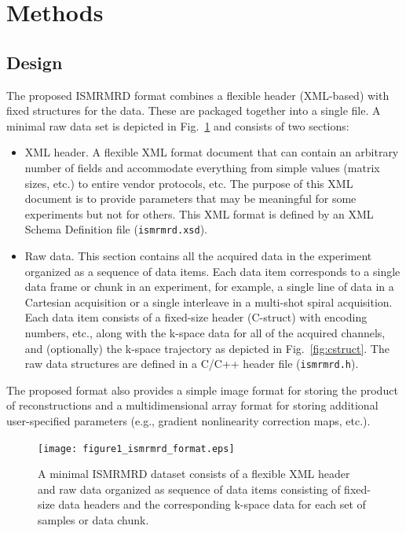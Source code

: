 \documentclass[12pt, draft]{article}
\begin{document}
\section*{Methods}
\subsection*{Design}
The proposed ISMRMRD format combines a flexible header (XML-based) with fixed structures for the data. These are packaged together into a single file.  A minimal raw data set is depicted in Fig.~\ref{fig:format} and consists of two sections:
\begin{itemize}
\item{XML header.} A flexible XML format document that can contain an arbitrary number of fields and accommodate everything from simple values (matrix sizes, etc.) to entire vendor protocols, etc. The purpose of this XML document is to provide parameters that may be meaningful for some experiments but not for others. This XML format is defined by an XML Schema Definition file (\texttt{ismrmrd.xsd}).
\item{Raw data.} This section contains all the acquired data in the experiment organized as a sequence of data items.  Each data item corresponds to a single data frame or chunk in an experiment, for example, a single line of data in a Cartesian acquisition or a single interleave in a multi-shot spiral acquisition. Each data item consists of a fixed-size header (C-struct) with encoding numbers, etc., along with the k-space data for all of the acquired channels, and (optionally) the k-space trajectory as depicted in Fig.~\ref{fig:cstruct}. The raw data structures are defined in a C/C++ header file (\texttt{ismrmrd.h}).
\end{itemize}
The proposed format also provides a simple image format for storing the product of reconstructions and a multidimensional array format for storing additional user-specified parameters (e.g., gradient nonlinearity correction maps, etc.).

\begin{figure}
\begin{center}
\texttt{[image: figure1\_ismrmrd\_format.eps]}
\caption{A minimal ISMRMRD dataset consists of a flexible XML header and raw data organized as sequence of data items consisting of fixed-size data headers and the corresponding k-space data for each set of samples or data chunk.}
\label{fig:format}
\end{center}
\end{figure}
\end{document}
